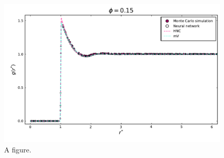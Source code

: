 
\begin{figure}
    \centering
    \includegraphics[width=\textwidth]{figuras/capitulo-3/comparison_p=0.15.pdf}
    \caption[New figure.]{A figure.}
    \label{fig:rdf15}
\end{figure}

